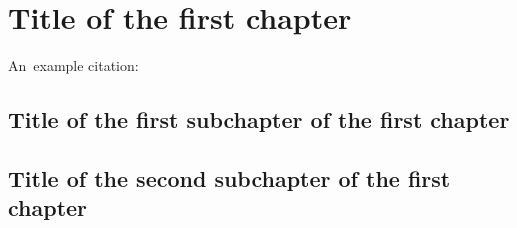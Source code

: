 \chapter{Title of the first chapter}

An~example citation: \cite{uradnik2024reducing}

\section{Title of the first subchapter of the first chapter}

\section{Title of the second subchapter of the first chapter}
